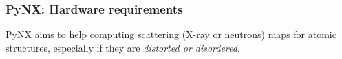\documentclass[]{beamer}
\begin{document}
\begin{frame}
\frametitle{PyNX: Hardware requirements}
PyNX aims to help computing scattering (X-ray or neutrons) maps for atomic structures, especially if they are \textit{distorted or disordered}.



\end{frame}
\end{document}
